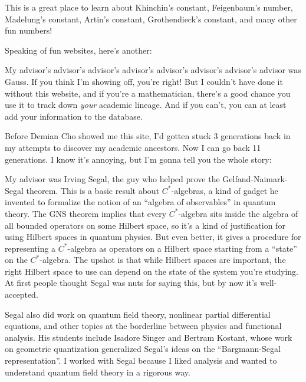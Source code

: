 \documentclass{article}
\def\tightlist{}
\renewcommand{\texttt}[1]{%
  \begingroup
  \ttfamily
  \begingroup\lccode`~=`/\lowercase{\endgroup\def~}{/\discretionary{}{}{}}%
  \begingroup\lccode`~=`[\lowercase{\endgroup\def~}{[\discretionary{}{}{}}%
  \begingroup\lccode`~=`.\lowercase{\endgroup\def~}{.\discretionary{}{}{}}%
  \catcode`/=\active\catcode`[=\active\catcode`.=\active
  \scantokens{#1\noexpand}%
  \endgroup
}
\begin{document}
This is a great place to learn about Khinchin's constant, Feigenbaum's
number, Madelung's constant, Artin's constant, Grothendieck's constant,
and many other fun numbers!

Speaking of fun websites, here's another:


My advisor's advisor's advisor's advisor's advisor's advisor's advisor's
advisor was Gauss. If you think I'm showing off, you're right! But I
couldn't have done it without this website, and if you're a
mathematician, there's a good chance you use it to track down
\emph{your} academic lineage. And if you can't, you can at least add
your information to the database.

Before Demian Cho showed me this site, I'd gotten stuck 3 generations
back in my attempts to discover my academic ancestors. Now I can go back
11 generations. I know it's annoying, but I'm gonna tell you the whole
story:

My advisor was Irving Segal, the guy who helped prove the
Gelfand-Naimark-Segal theorem. This is a basic result about
\(C^*\)-algebras, a kind of gadget he invented to formalize the notion
of an ``algebra of observables'' in quantum theory. The GNS theorem
implies that every \(C^*\)-algebra sits inside the algebra of all
bounded operators on some Hilbert space, so it's a kind of justification
for using Hilbert spaces in quantum physics. But even better, it gives a
procedure for representing a \(C^*\)-algebra as operators on a Hilbert
space starting from a ``state'' on the \(C^*\)-algebra. The upshot is
that while Hilbert spaces are important, the right Hilbert space to use
can depend on the state of the system you're studying. At first people
thought Segal was nuts for saying this, but by now it's well-accepted.

Segal also did work on quantum field theory, nonlinear partial
differential equations, and other topics at the borderline between
physics and functional analysis. His students include Isadore Singer and
Bertram Kostant, whose work on geometric quantization generalized
Segal's ideas on the ``Bargmann-Segal representation''. I worked with
Segal because I liked analysis and wanted to understand quantum field
theory in a rigorous way.
\end{document}
